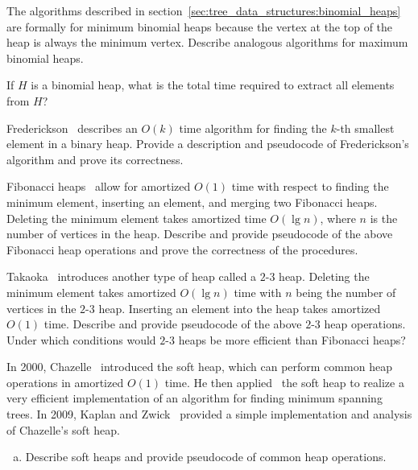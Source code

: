 \begin{problem}
\item The algorithms described in
  section~\ref{sec:tree_data_structures:binomial_heaps} are formally
  for minimum binomial heaps because the
  vertex at the top of the heap is always the minimum vertex. Describe
  analogous algorithms for maximum
  binomial heaps.

\item If $H$ is a binomial heap, what is the
  total time required to extract all elements from $H$?

\item Frederickson~\cite{Frederickson1993}
  describes an $O(k)$ time algorithm for finding the $k$-th smallest
  element in a binary heap. Provide a description and pseudocode of
  Frederickson's algorithm and prove its correctness.

\item Fibonacci heaps~\cite{FredmanTarjan1984} allow for amortized
  $O(1)$ time with respect to finding the minimum element,
  inserting an element, and merging two Fibonacci heaps. Deleting the
  minimum element takes amortized time $O(\lg n)$, where $n$ is the
  number of vertices in the heap. Describe and provide pseudocode of
  the above Fibonacci heap operations and prove the correctness of the
  procedures.

\item Takaoka~\cite{Takaoka1999a} introduces
  another type of heap called a $2$-$3$ heap. Deleting the minimum
  element takes amortized $O(\lg n)$ time with $n$ being the number of
  vertices in the $2$-$3$ heap. Inserting an element into the heap
  takes amortized $O(1)$ time. Describe and provide pseudocode of the
  above $2$-$3$ heap operations. Under which conditions would $2$-$3$
  heaps be more efficient than Fibonacci heaps?

\item In 2000, Chazelle~\cite{Chazelle2000a}
  introduced the soft heap, which can perform common heap operations
  in amortized $O(1)$ time. He then applied~\cite{Chazelle2000b} the
  soft heap to realize a very efficient implementation of an algorithm
  for finding minimum spanning trees. In 2009,
  Kaplan and
  Zwick~\cite{KaplanZwick2009} provided a simple
  implementation and analysis of Chazelle's soft heap.
  \begin{enumerate}[(a)]
  \item Describe soft heaps and provide pseudocode of common heap
    operations.


\end{enumerate}
\end{problem}
